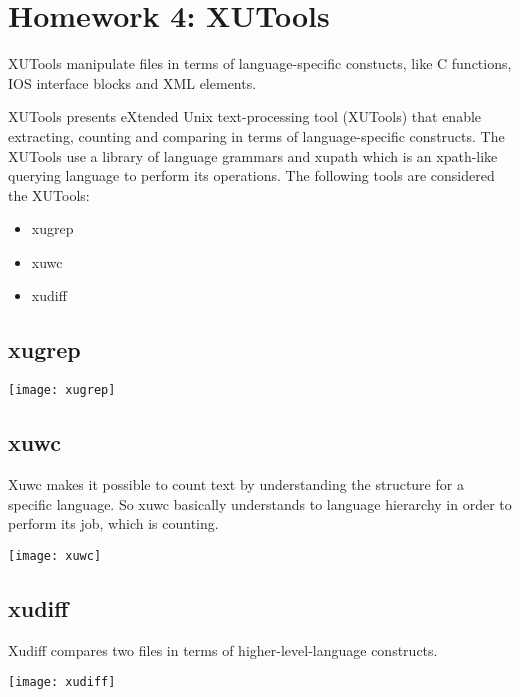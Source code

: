 
\section[Homework 4]{Homework 4: XUTools}

XUTools manipulate files in terms of language-specific constucts, like C functions, IOS interface blocks and XML elements.

XUTools presents eXtended Unix text-processing tool (XUTools) that enable extracting, counting and comparing in terms of language-specific constructs. The XUTools use a library of language grammars and xupath which is an xpath-like querying language to perform its operations. The following tools are considered the XUTools:

\begin{itemize}
	\item xugrep
	\item xuwc
	\item xudiff
\end{itemize}

\subsection{xugrep}

	\texttt{[image: xugrep]}

\subsection{xuwc}

Xuwc makes it possible to count text by understanding the structure for a specific language. So xuwc basically understands to language hierarchy in order to perform its job, which is counting. 

       \texttt{[image: xuwc]}

\subsection{xudiff}

Xudiff compares two files in terms of higher-level-language constructs.

	\texttt{[image: xudiff]}
